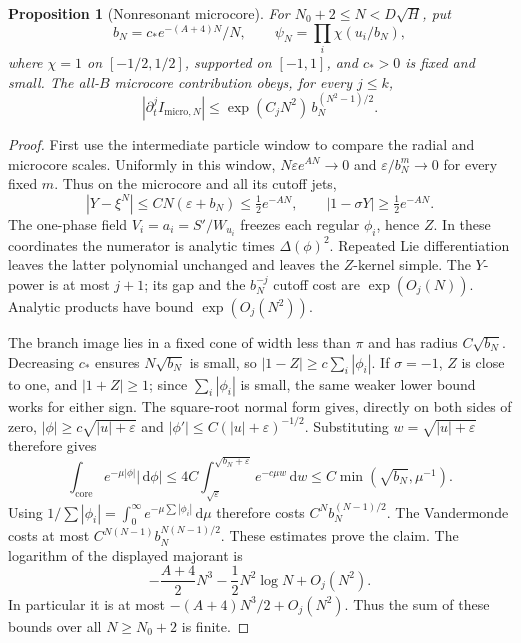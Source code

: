 \documentclass[11pt]{article}
\numberwithin{equation}{section}
\newtheorem{proposition}[theorem]{Proposition}
\theoremstyle{definition}
\newcommand{\dd}{\,\mathrm d}
\newcommand{\eps}{\varepsilon}
\begin{document}
\begin{proposition}[Nonresonant microcore]\label{prop:micro}
For \(N_0+2\le N<D\sqrt H\), put
\[
 b_N=c_*e^{-(A+4)N}/N,\qquad
 \psi_N=\prod_i\chi(u_i/b_N),
\]
where \(\chi=1\) on \([-1/2,1/2]\), supported on \([-1,1]\), and
\(c_*>0\) is fixed and small. The all-\(B\) microcore contribution
obeys, for every \(j\le k\),
\[
 |\partial_t^j I_{\mathrm{micro},N}|
 \le \exp(C_jN^2)\,b_N^{(N^2-1)/2}.
\]
\end{proposition}
\begin{proof}
First use the intermediate particle window to compare the radial and
microcore scales. Uniformly in this window,
\(N\eps e^{AN}\to0\) and \(\eps/b_N^m\to0\) for every fixed \(m\).
Thus on the microcore and all its cutoff jets,
\[
 |Y-\xi^N|\le CN(\eps+b_N)\le\tfrac12e^{-AN},
 \qquad |1-\sigma Y|\ge\tfrac12e^{-AN}.
\]
The one-phase field \(V_i=a_i=S'/W_{u_i}\) freezes each regular
\(\phi_i\), hence \(Z\). In these coordinates the numerator is
analytic times \(\Delta(\phi)^2\).
Repeated Lie differentiation leaves the latter polynomial unchanged
and leaves the \(Z\)-kernel simple. The \(Y\)-power is at most
\(j+1\); its gap and the \(b_N^{-j}\) cutoff cost are
\(\exp(O_j(N))\). Analytic products have bound \(\exp(O_j(N^2))\).

The branch image lies in a fixed cone of width less than \(\pi\)
and has radius \(C\sqrt{b_N}\). Decreasing \(c_*\) ensures
\(N\sqrt{b_N}\) is small, so $|1-Z|\ge c\sum_i|\phi_i|$. If $\sigma=-1$,
$Z$ is close to one, and $|1+Z|\ge1$; since $\sum_i|\phi_i|$
is small, the same weaker lower bound works for either sign.
The square-root normal form gives, directly on both sides of zero,
\(|\phi|\ge c\sqrt{|u|+\eps}\) and
\(|\phi'|\le C(|u|+\eps)^{-1/2}\). Substituting
\(w=\sqrt{|u|+\eps}\) therefore gives
\[
 \int_{\mathrm{core}}e^{-\mu|\phi|}|\dd\phi|
       \le4C\int_{\sqrt\eps}^{\sqrt{b_N+\eps}}e^{-c\mu w}\dd w
       \le C\min(\sqrt{b_N},\mu^{-1}).
\]
Using \(1/\sum|\phi_i|=\int_0^\infty e^{-\mu\sum|\phi_i|}\dd \mu\)
therefore costs \(C^N b_N^{(N-1)/2}\).
The Vandermonde costs at most
\(C^{N(N-1)}b_N^{N(N-1)/2}\). These estimates prove the claim.
The logarithm of the displayed majorant is
\[
 -\frac{A+4}{2}N^3-\frac12N^2\log N+O_j(N^2).
\]
In particular it is at most \(-(A+4)N^3/2+O_j(N^2)\).
Thus the sum of these bounds over all \(N\ge N_0+2\) is finite.
\end{proof}
\end{document}
